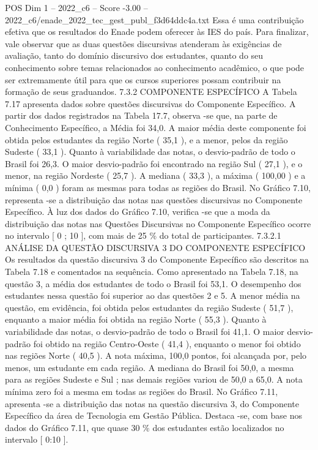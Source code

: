 \begin{textsample}{POS Dim 1 – 2022\_c6 – Score -3.00 – 2022\_c6/enade\_2022\_tec\_gest\_publ\_f3d64ddc4a.txt}
Essa é uma contribuição efetiva que os resultados do Enade podem oferecer às IES do país.
Para finalizar, vale observar que as duas questões discursivas atenderam às exigências de avaliação, tanto do domínio discursivo dos estudantes, quanto do seu conhecimento sobre temas relacionados ao conhecimento acadêmico, o que pode ser extremamente útil para que os cursos superiores possam contribuir na formação de seus graduandos. 7.3.2 COMPONENTE ESPECÍFICO A Tabela 7.17 apresenta dados sobre questões discursivas do Componente Específico.
A partir dos dados registrados na Tabela 17.7, observa -se que, na parte de Conhecimento Específico, a Média foi 34,0.
A maior média deste componente foi obtida pelos estudantes da região Norte ( 35,1 ), e a menor, pelos da região Sudeste ( 33,1 ).
Quanto à variabilidade das notas, o desvio-padrão de todo o Brasil foi 26,3.
O maior desvio-padrão foi encontrado na região Sul ( 27,1 ), e o menor, na região Nordeste ( 25,7 ).
A mediana ( 33,3 ), a máxima ( 100,00 ) e a mínima ( 0,0 ) foram as mesmas para todas as regiões do Brasil.
No Gráfico 7.10, representa -se a distribuição das notas nas questões discursivas no Componente Específico.
À luz dos dados do Gráfico 7.10, verifica -se que a moda da distribuição das notas nas Questões Discursivas no Componente Específico ocorre no intervalo [ 0 ; 10 ], com mais de 25 \% do total de participantes. 7.3.2.1 ANÁLISE DA QUESTÃO DISCURSIVA 3 DO COMPONENTE ESPECÍFICO Os resultados da questão discursiva 3 do Componente Específico são descritos na Tabela 7.18 e comentados na sequência.
Como apresentado na Tabela 7.18, na questão 3, a média dos estudantes de todo o Brasil foi 53,1.
O desempenho dos estudantes nessa questão foi superior ao das questões 2 e 5.
A menor média na questão, em evidência, foi obtida pelos estudantes da região Sudeste ( 51,7 ), enquanto a maior média foi obtida na região Norte ( 55,3 ).
Quanto à variabilidade das notas, o desvio-padrão de todo o Brasil foi 41,1.
O maior desvio-padrão foi obtido na região Centro-Oeste ( 41,4 ), enquanto o menor foi obtido nas regiões Norte ( 40,5 ).
A nota máxima, 100,0 pontos, foi alcançada por, pelo menos, um estudante em cada região.
A mediana do Brasil foi 50,0, a mesma para as regiões Sudeste e Sul ; nas demais regiões variou de 50,0 a 65,0.
A nota mínima zero foi a mesma em todas as regiões do Brasil.
No Gráfico 7.11, apresenta -se a distribuição das notas na questão discursiva 3, do Componente Específico da área de Tecnologia em Gestão Pública.
Destaca -se, com base nos dados do Gráfico 7.11, que quase 30 \% dos estudantes estão localizados no intervalo [ 0:10 ].

\end{textsample}
